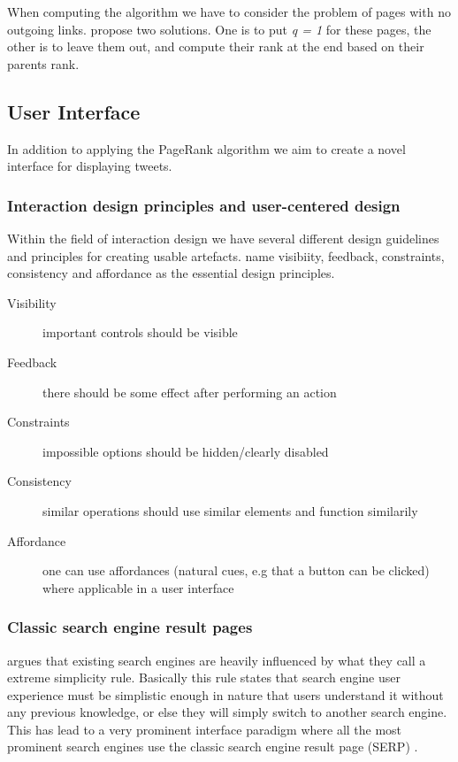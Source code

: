 When computing the algorithm we have to consider the problem of pages with no outgoing links. \citet{Baeza-Yates2011} propose two solutions. One is to put \emph{q = 1} for these pages, the other is to leave them out, and compute their rank at the end based on their parents rank. 


\subsection{User Interface}
In addition to applying the PageRank algorithm we aim to create a novel interface for displaying tweets.

\subsubsection{Interaction design principles and user-centered design}
Within the field of interaction design we have several different design guidelines and principles for creating usable artefacts. \citet{Sharp2007} name visibiity, feedback, constraints, consistency and affordance as the essential design principles.

\begin{description}
  \item[Visibility] important controls should be visible
  \item[Feedback] there should be some effect after performing an action
  \item[Constraints] impossible options should be hidden/clearly disabled
  \item[Consistency] similar operations should use similar elements and function similarily
  \item[Affordance] one can use affordances (natural cues, e.g that a button can be clicked) where applicable in a user interface
\end{description}

\subsubsection{Classic search engine result pages}
\citet[p.480]{Baeza-Yates2011} argues that existing search engines are heavily influenced by what they call a extreme simplicity rule. Basically this rule states that search engine user experience must be simplistic enough in nature that users understand it without any previous knowledge, or else they will simply switch to another search engine. This has lead to a very prominent interface paradigm where all the most prominent search engines use the classic search engine result page (SERP) \citep{Baeza-Yates2011}. 

